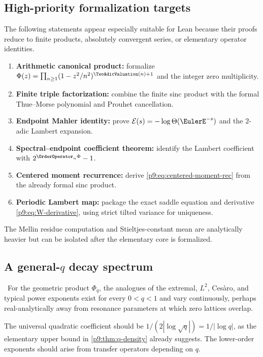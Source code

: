\documentclass[11pt]{article}
\numberwithin{equation}{section}
\theoremstyle{definition}
\theoremstyle{remark}
\begin{document}
\subsection{High-priority formalization targets}
The following statements appear especially suitable for Lean because their proofs reduce to
finite products, absolutely convergent series, or elementary operator identities.
\begin{enumerate}
\item \textbf{Arithmetic canonical product:} formalize
$\Phi(z)=\prod_{n\ge1}(1-z^2/n^2)^{\TwoAdicValuation(n)+1}$ and the integer zero multiplicity.
\item \textbf{Finite triple factorization:} combine the finite sinc product with the
formal Thue--Morse polynomial and Prouhet cancellation.
\item \textbf{Endpoint Mahler identity:} prove
$\mathcal E(s)=-\log\Theta(\EulerE^{-s})$ and the $2$-adic Lambert expansion.
\item \textbf{Spectral--endpoint coefficient theorem:} identify the Lambert coefficient
with $2^{\OrderOperator_n\Phi}-1$.
\item \textbf{Centered moment recurrence:} derive
\eqref{p9:eq:centered-moment-rec} from the already formal sinc product.
\item \textbf{Periodic Lambert map:} package the exact saddle equation and derivative
\eqref{p9:eq:W-derivative}, using strict tilted variance for uniqueness.
\end{enumerate}
The Mellin residue computation and Stieltjes-constant mean are analytically heavier but can
be isolated after the elementary core is formalized.

\subsection{A general-$q$ decay spectrum}
\begin{conjecture}\label{p9:conj:q-spectrum}
\statusC\ For the geometric product $\Phi_q$, the analogues of the extremal, $L^2$,
Ces\`aro, and typical power exponents exist for every $0<q<1$ and vary continuously, perhaps
real-analytically away from resonance parameters at which zero lattices overlap.
\end{conjecture}
The universal quadratic coefficient should be
$1/(2|\log\sqrt q|)=1/|\log q|$, as the elementary upper bound in
\cref{p9:thm:q-density} already suggests.  The lower-order exponents should arise from transfer
operators depending on $q$.
\end{document}

